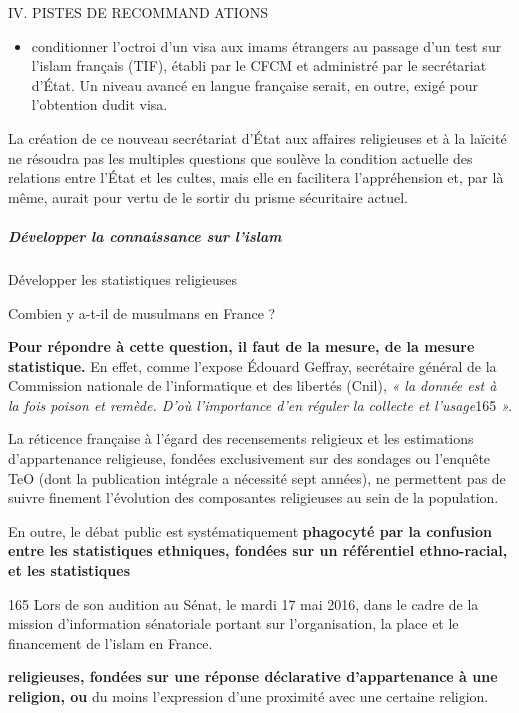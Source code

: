 IV. PISTES DE RECOMMAND ATIONS


\begin{itemize}
\item
  conditionner l'octroi d'un visa aux imams étrangers au passage d'un
  test sur l'islam français (TIF), établi par le CFCM et administré par
  le secrétariat d'État. Un niveau avancé en langue française serait, en
  outre, exigé pour l'obtention dudit visa.
\end{itemize}


La création de ce nouveau secrétariat d'État aux affaires religieuses et
à la laïcité ne résoudra pas les multiples questions que soulève la
condition actuelle des relations entre l'État et les cultes, mais elle
en facilitera l'appréhension et, par là même, aurait pour vertu de le
sortir du prisme sécuritaire actuel.


\hypertarget{duxe9velopper-la-connaissance-sur-lislam}{%
\subparagraph{Développer la connaissance sur
l'islam}\label{duxe9velopper-la-connaissance-sur-lislam}}

Développer les statistiques religieuses

Combien y a-t-il de musulmans en France ?


\textbf{Pour répondre à cette question, il faut de la mesure, de la
mesure statistique.} En effet, comme l'expose Édouard Geffray,
secrétaire général de la Commission nationale de l'informatique et des
libertés (Cnil), \emph{« la donnée est à la fois poison et remède. D'où
l'importance d'en réguler la collecte et l'usage}165 \emph{».}

La réticence française à l'égard des recensements religieux et les
estimations d'appartenance religieuse, fondées exclusivement sur des
sondages ou l'enquête TeO (dont la publication intégrale a nécessité
sept années), ne permettent pas de suivre finement l'évolution des
composantes religieuses au sein de la population.

En outre, le débat public est systématiquement \textbf{phagocyté par la
confusion entre les statistiques ethniques, fondées sur un référentiel
ethno-racial, et les statistiques}

165 Lors de son audition au Sénat, le mardi 17 mai 2016, dans le cadre
de la mission d'information sénatoriale portant sur l'organisation, la
place et le financement de l'islam en France.



\textbf{religieuses, fondées sur une réponse déclarative d'appartenance
à une religion, ou} du moins l'expression d'une proximité avec une
certaine religion.


